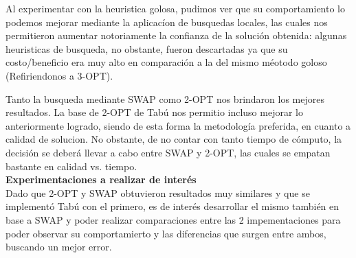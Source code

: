 Al experimentar con la heuristica golosa, pudimos ver que su comportamiento lo podemos mejorar mediante la aplicacíon de busquedas locales, las cuales nos permitieron aumentar notoriamente la confianza de la solución obtenida: algunas heuristicas de busqueda, no obstante, fueron descartadas ya que  su costo/beneficio era muy alto en comparación a la del mismo méotodo goloso (Refiriendonos a 3-OPT). 

Tanto la busqueda mediante SWAP como 2-OPT nos brindaron los mejores resultados. La base de 2-OPT de Tabú nos permitio incluso mejorar lo anteriormente logrado, siendo de esta forma la metodología preferida, en cuanto a calidad de solucion. No obstante, de no contar con tanto tiempo de cómputo, la decisi\'on se deberá llevar a cabo entre SWAP y 2-OPT, las cuales se empatan bastante en calidad vs. tiempo.\\

\textbf{Experimentaciones a realizar de interés}\\
Dado que 2-OPT y SWAP obtuvieron resultados muy similares y que se implementó Tabú con el primero, es de interés desarrollar el mismo también en base a SWAP y poder realizar comparaciones entre las 2 impementaciones para poder observar su comportamierto y las diferencias que surgen entre ambos, buscando un mejor error.

